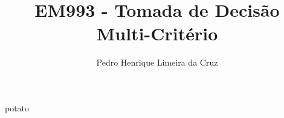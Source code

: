 \documentclass{article}
\author{Pedro Henrique Limeira da Cruz}
\title{EM993 - Tomada de Decisão Multi-Critério}
\begin{document}
    
    \maketitle
    \thispagestyle{empty}
    
    
    \newpage
    \tableofcontents
    \newpage
    \begin{note}
        potato
    \end{note}
\end{document}
